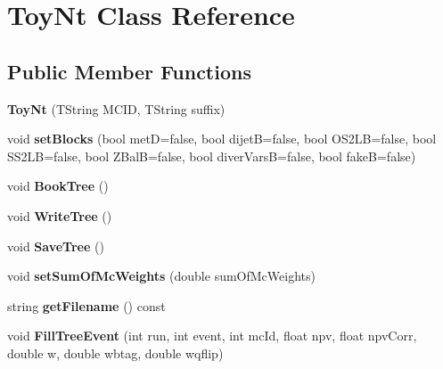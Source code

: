 \hypertarget{classToyNt}{
\section{ToyNt Class Reference}
\label{classToyNt}
}
\subsection*{Public Member Functions}
\begin{DoxyCompactItemize}
\item 
\hypertarget{classToyNt_ac5182614e93549a4771f0455d5afd895}{
{\bfseries ToyNt} (TString MCID, TString suffix)}
\label{classToyNt_ac5182614e93549a4771f0455d5afd895}

\item 
\hypertarget{classToyNt_abbfd75eca96ec2c41498f7c86f98931f}{
void {\bfseries setBlocks} (bool metD=false, bool dijetB=false, bool OS2LB=false, bool SS2LB=false, bool ZBalB=false, bool diverVarsB=false, bool fakeB=false)}
\label{classToyNt_abbfd75eca96ec2c41498f7c86f98931f}

\item 
\hypertarget{classToyNt_a72ed3a78d77c5306c29566212fbc5d03}{
void {\bfseries BookTree} ()}
\label{classToyNt_a72ed3a78d77c5306c29566212fbc5d03}

\item 
\hypertarget{classToyNt_a619974752eeec49d1f6443630fa4012e}{
void {\bfseries WriteTree} ()}
\label{classToyNt_a619974752eeec49d1f6443630fa4012e}

\item 
\hypertarget{classToyNt_a8a806b704669ab7f065e0c60b8854446}{
void {\bfseries SaveTree} ()}
\label{classToyNt_a8a806b704669ab7f065e0c60b8854446}

\item 
\hypertarget{classToyNt_a598244a544cf7bfedfcee3bed7c89b25}{
void {\bfseries setSumOfMcWeights} (double sumOfMcWeights)}
\label{classToyNt_a598244a544cf7bfedfcee3bed7c89b25}

\item 
\hypertarget{classToyNt_a316cf21d8918dea324e0edc7f4dcebf9}{
string {\bfseries getFilename} () const }
\label{classToyNt_a316cf21d8918dea324e0edc7f4dcebf9}

\item 
\hypertarget{classToyNt_a34261ab251c209f19ebf2d4a003d975c}{
void {\bfseries FillTreeEvent} (int run, int event, int mcId, float npv, float npvCorr, double w, double wbtag, double wqflip)}
\label{classToyNt_a34261ab251c209f19ebf2d4a003d975c}


\end{DoxyCompactItemize}
